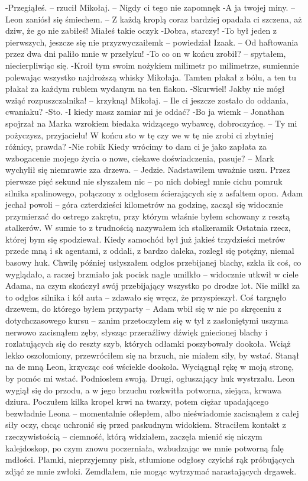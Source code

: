 \documentclass[../MAIN.tex]{subfiles}
\begin{document}
-Przegiąłeś. -- rzucił Mikołaj. -- Nigdy ci tego nie zapomnę\3k
-A ja twojej miny. -- Leon zaniósł się śmiechem. -- Z każdą kroplą coraz bardziej opadała ci szczena, aż dziw, że go nie zabiłeś! Miałeś takie oczy\3k
-Dobra, starczy!
-To był jeden z pierwszych, jeszcze się nie przyzwyczaiłem\3k -- powiedział Izaak. -- Od haftowania przez dwa dni paliło mnie w przełyku!
-To co on w końcu zrobił? -- spytałem, niecierpliwiąc się.
-Kroił tym swoim nożykiem milimetr po milimetrze, sumiennie polewając wszystko najdroższą whisky Mikołaja. Tamten płakał z bólu, a ten tu płakał za każdym rublem wydanym na ten flakon.
-Skurwiel! Jakby nie mógł wziąć rozpuszczalnika! -- krzyknął Mikołaj. -- Ile ci jeszcze zostało do oddania, cwaniaku?
-Sto.
-I kiedy masz zamiar mi je oddać?
-Bo ja wiem\3k -- Jonathan spojrzał na Marka wzrokiem biedaka widzącego wybawcę, dobroczyńcę. -- Ty mi pożyczysz, przyjacielu! W końcu sto w tę czy we w tę nie zrobi ci zbytniej różnicy, prawda?
-Nie robi\3k Kiedy wrócimy to dam ci je jako zapłata za wzbogacenie mojego życia o nowe, ciekawe doświadczenia, pasuje? -- Mark wychylił się niemrawie zza drzewa. -- Jedzie.
Nadstawiłem uważnie uszu.
Przez pierwsze pięć sekund nie słyszałem nic -- po nich dobiegł mnie cichu pomruk silnika spalinowego, połączony z odgłosem ścierających się z asfaltem opon. Adam jechał powoli -- góra czterdzieści kilometrów na godzinę, zaczął się widocznie przymierzać do ostrego zakrętu, przy którym właśnie byłem schowany z resztą stalkerów. W sumie to z trudnością nazywałem ich stalkerami\3k
Ostatnia rzecz, której bym się spodziewał.
Kiedy samochód był już jakieś trzydzieści metrów przede mną i s\3k agentami, z oddali, z bardzo daleka, rozległ się potężny, niemal basowy huk. Chwilę później usłyszałem odgłos przebijanej blachy, szkła i\3k coś, co wyglądało, a raczej brzmiało jak pocisk nagle umilkło -- widocznie utkwił w ciele Adama, na czym skończył swój przebijający wszystko po drodze lot. Nie milkł za to odgłos silnika i kół auta -- zdawało się wręcz, że przyspieszył. Coś targnęło drzewem, do którego byłem przyparty -- Adam wbił się w nie po skręceniu z dotychczasowego kursu -- zanim przetoczyłem się w tył z zasłoniętymi uszyma nerwowo zacisnąłem zęby, słysząc przeraźliwy dźwięk gniecionej blachy i rozlatujących się do reszty szyb, których odłamki poszybowały dookoła.
Wciąż lekko oszołomiony, przewróciłem się na brzuch, nie miałem siły, by wstać.
Stanął na de mną Leon, krzycząc coś wściekle dookoła. Wyciągnął rękę w moją stronę, by pomóc mi wstać. Podniosłem swoją.
Drugi, ogłuszający huk wystrzału.
Leon wygiął się do przodu, a w jego brzuchu rozkwitła potworna, ziejąca, krwawa dziura. Poczułem kilka kropel krwi na twarzy, potem ciężar upadającego bezwładnie Leona -- momentalnie oślepłem, albo nieświadomie zacisnąłem z całej siły oczy, chcąc uchronić się przed paskudnym widokiem. Straciłem kontakt z rzeczywistością -- ciemność, którą widziałem, zaczęła mienić się niczym kalejdoskop, po czym znowu poczerniała, wzbudzając we mnie potworną falę mdłości. Plamki, nieprzyjemny pisk, stłumione odgłosy czyichś rąk próbujących zdjąć ze mnie zwłoki. Zemdlałem, nie mogąc wytrzymać narastających drgawek.
\end{document}
